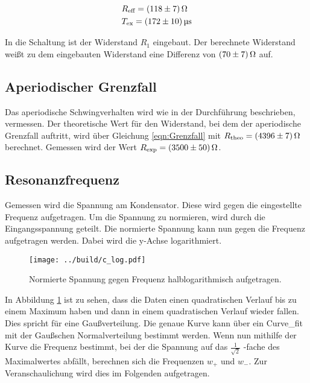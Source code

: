 \begin{align}
    &R_{\text{eff}} = \qty{118 \pm 7}{\ohm} \\
    &T_{\text{ex}} = \qty{172 \pm 10}{\micro \second}
\end{align}    

\noindent In die Schaltung ist der Widerstand $R_1$ eingebaut. Der berechnete Widerstand weißt zu dem eingebauten Widerstand eine Differenz 
von $\qty{70 \pm 7}{\ohm}$ auf. 


\subsection{Aperiodischer Grenzfall}

Das aperiodische Schwingverhalten wird wie in der Durchführung beschrieben, vermessen. Der theoretische Wert für den Widerstand, bei dem der aperiodische
Grenzfall auftritt, wird über Gleichung \eqref{eqn:Grenzfall} mit $R_\text{theo} = \qty{4396 \pm 7}{\ohm}$ berechnet.
Gemessen wird der Wert $R_\text{exp} = \qty{3500 \pm 50}{\ohm}$.

\subsection{Resonanzfrequenz}

Gemessen wird die Spannung am Kondensator. Diese wird gegen die eingestellte Frequenz aufgetragen. Um die Spannung zu normieren, wird durch 
die Eingangsspannung geteilt. Die normierte Spannung kann nun gegen die Frequenz aufgetragen werden. 
Dabei wird die y-Achse logarithmiert. 

\begin{figure}[H]
    \texttt{[image: ../build/c\_log.pdf]}
    \caption{Normierte Spannung gegen Frequenz halblogarithmisch aufgetragen.}
    \label{fig:c_log}
\end{figure}

\noindent In Abbildung \ref{fig:c_log} ist zu sehen, dass die Daten einen quadratischen Verlauf bis zu einem Maximum haben und dann in einem 
quadratischen Verlauf wieder fallen. Dies spricht für eine Gaußverteilung.
Die genaue Kurve kann über ein Curve\_fit mit der Gaußschen Normalverteilung bestimmt werden. Wenn nun mithilfe der Kurve die 
Frequenz bestimmt, bei der die Spannung auf das $\frac{1}{\sqrt 2}$ -fache des Maximalwertes abfällt, berechnen sich die Frequenzen $w_+$ und 
$w_-$. Zur Veranschaulichung wird dies im Folgenden aufgetragen.

